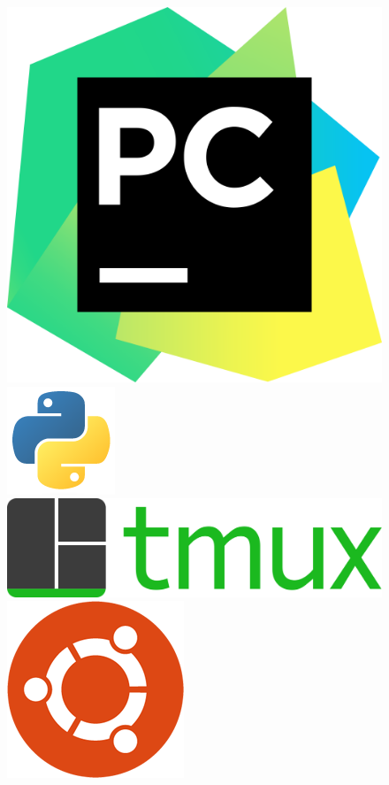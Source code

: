 \begin{figure}[t]
  \includegraphics[height=\developmentToolsLogosHeight]{assets/tools/development/pycharm.png}
  \includegraphics[height=\developmentToolsLogosHeight]{assets/tools/development/python.png}
  \includegraphics[height=\developmentToolsLogosHeight]{assets/tools/development/tmux.png}
  \includegraphics[height=\developmentToolsLogosHeight]{assets/tools/development/ubuntu.png}

\end{figure}
